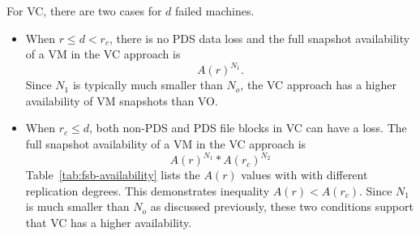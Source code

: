 For VC, there are two cases for $d$ failed machines.
\begin{itemize}
\item
When $r \le d<r_c$,  there is no PDS data loss and  
the full snapshot availability of a VM in the VC approach is 
\begin{equation}
\label{eq:VC1}
A(r)^{N_1}.
\end{equation}
Since $N_1$ is typically much smaller than $N_o$, 
the VC approach has a higher availability of VM snapshots than VO.

\item
When $r_c \leq d$, both non-PDS and PDS file blocks in VC can have a loss.
The full snapshot availability of  a VM in the VC approach is
\begin{equation}
\label{eq:VC2}
A(r)^{N_1} * A(r_c)^{N_2}
\end{equation}
Table~\ref{tab:fsb-availability} lists the $A(r)$ values with
with different replication degrees. This demonstrates inequality 
$A(r) < A(r_c)$.  Since $N_1$ is much smaller than $N_o$ as discussed previously, 
these two conditions support that VC has a  higher availability. 
\end{itemize} 


